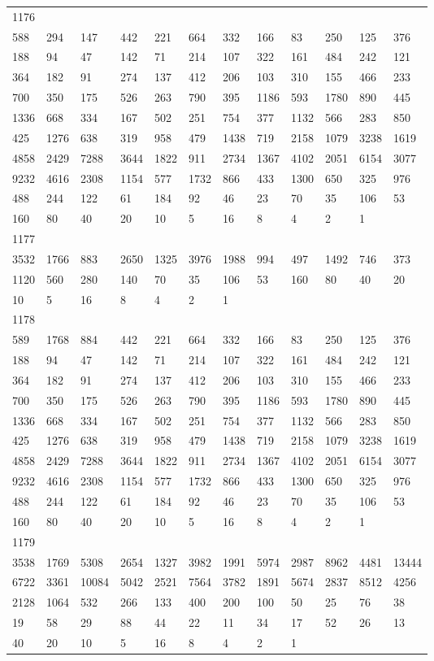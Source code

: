 \begin{longtable}{llllllllllll}
1176&&&&&&&&&&&\\
588& 294& 147& 442& 221& 664& 332& 166& 83& 250& 125& 376\\
188& 94& 47& 142& 71& 214& 107& 322& 161& 484& 242& 121\\
364& 182& 91& 274& 137& 412& 206& 103& 310& 155& 466& 233\\
700& 350& 175& 526& 263& 790& 395& 1186& 593& 1780& 890& 445\\
1336& 668& 334& 167& 502& 251& 754& 377& 1132& 566& 283& 850\\
425& 1276& 638& 319& 958& 479& 1438& 719& 2158& 1079& 3238& 1619\\
4858& 2429& 7288& 3644& 1822& 911& 2734& 1367& 4102& 2051& 6154& 3077\\
9232& 4616& 2308& 1154& 577& 1732& 866& 433& 1300& 650& 325& 976\\
488& 244& 122& 61& 184& 92& 46& 23& 70& 35& 106& 53\\
160& 80& 40& 20& 10& 5& 16& 8& 4& 2& 1& \\

1177&&&&&&&&&&&\\
3532& 1766& 883& 2650& 1325& 3976& 1988& 994& 497& 1492& 746& 373\\
1120& 560& 280& 140& 70& 35& 106& 53& 160& 80& 40& 20\\
10& 5& 16& 8& 4& 2& 1& \\

1178&&&&&&&&&&&\\
589& 1768& 884& 442& 221& 664& 332& 166& 83& 250& 125& 376\\
188& 94& 47& 142& 71& 214& 107& 322& 161& 484& 242& 121\\
364& 182& 91& 274& 137& 412& 206& 103& 310& 155& 466& 233\\
700& 350& 175& 526& 263& 790& 395& 1186& 593& 1780& 890& 445\\
1336& 668& 334& 167& 502& 251& 754& 377& 1132& 566& 283& 850\\
425& 1276& 638& 319& 958& 479& 1438& 719& 2158& 1079& 3238& 1619\\
4858& 2429& 7288& 3644& 1822& 911& 2734& 1367& 4102& 2051& 6154& 3077\\
9232& 4616& 2308& 1154& 577& 1732& 866& 433& 1300& 650& 325& 976\\
488& 244& 122& 61& 184& 92& 46& 23& 70& 35& 106& 53\\
160& 80& 40& 20& 10& 5& 16& 8& 4& 2& 1& \\

1179&&&&&&&&&&&\\
3538& 1769& 5308& 2654& 1327& 3982& 1991& 5974& 2987& 8962& 4481& 13444\\
6722& 3361& 10084& 5042& 2521& 7564& 3782& 1891& 5674& 2837& 8512& 4256\\
2128& 1064& 532& 266& 133& 400& 200& 100& 50& 25& 76& 38\\
19& 58& 29& 88& 44& 22& 11& 34& 17& 52& 26& 13\\
40& 20& 10& 5& 16& 8& 4& 2& 1& \\


\end{longtable}

